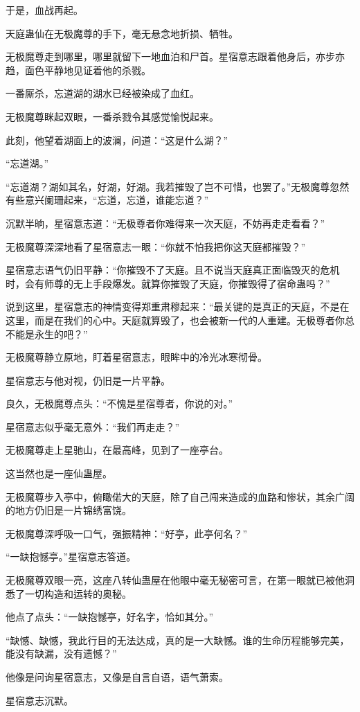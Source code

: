 \begin{this_body}
于是，血战再起。

天庭蛊仙在无极魔尊的手下，毫无悬念地折损、牺牲。

无极魔尊走到哪里，哪里就留下一地血泊和尸首。星宿意志跟着他身后，亦步亦趋，面色平静地见证着他的杀戮。

一番厮杀，忘道湖的湖水已经被染成了血红。

无极魔尊眯起双眼，一番杀戮令其感觉愉悦起来。

此刻，他望着湖面上的波澜，问道：“这是什么湖？”

“忘道湖。”

“忘道湖？湖如其名，好湖，好湖。我若摧毁了岂不可惜，也罢了。”无极魔尊忽然有些意兴阑珊起来，“忘道，忘道，谁能忘道？”

沉默半晌，星宿意志道：“无极尊者你难得来一次天庭，不妨再走走看看？”

无极魔尊深深地看了星宿意志一眼：“你就不怕我把你这天庭都摧毁？”

星宿意志语气仍旧平静：“你摧毁不了天庭。且不说当天庭真正面临毁灭的危机时，会有师尊的无上手段爆发。就算你摧毁了天庭，你摧毁得了宿命蛊吗？”

说到这里，星宿意志的神情变得郑重肃穆起来：“最关键的是真正的天庭，不是在这里，而是在我们的心中。天庭就算毁了，也会被新一代的人重建。无极尊者你总不能是永生的吧？”

无极魔尊静立原地，盯着星宿意志，眼眸中的冷光冰寒彻骨。

星宿意志与他对视，仍旧是一片平静。

良久，无极魔尊点头：“不愧是星宿尊者，你说的对。”

星宿意志似乎毫无意外：“我们再走走？”

无极魔尊走上星驰山，在最高峰，见到了一座亭台。

这当然也是一座仙蛊屋。

无极魔尊步入亭中，俯瞰偌大的天庭，除了自己闯来造成的血路和惨状，其余广阔的地方仍旧是一片锦绣富饶。

无极魔尊深呼吸一口气，强振精神：“好亭，此亭何名？”

“一缺抱憾亭。”星宿意志答道。

无极魔尊双眼一亮，这座八转仙蛊屋在他眼中毫无秘密可言，在第一眼就已被他洞悉了一切构造和运转的奥秘。

他点了点头：“一缺抱憾亭，好名字，恰如其分。”

“缺憾、缺憾，我此行目的无法达成，真的是一大缺憾。谁的生命历程能够完美，能没有缺漏，没有遗憾？”

他像是问询星宿意志，又像是自言自语，语气萧索。

星宿意志沉默。


\end{this_body}
